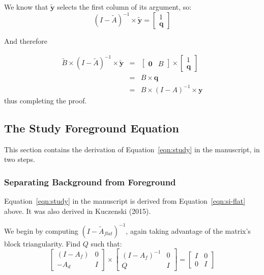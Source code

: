 We know that $\tilde{\mathbf{y}}$ selects the first column of its argument, so:
\begin{equation}
  (I-\tilde{A})^{-1}\times\tilde{\mathbf{y}} = \left[\begin{array}{c}
      1\\
      \mathbf{q}
    \end{array}\right]
\end{equation}

And therefore

\begin{eqnarray}
  \tilde{B}\times(I-\tilde{A})^{-1}\times\tilde{\mathbf{y}} &=& \left[\begin{array}{cc}\mathbf{0}&B\end{array}\right]\times\left[\begin{array}{c}
      1\\
      \mathbf{q}
    \end{array}\right]\\
   &=&B\times\mathbf{q}\\
   &=&B\times(I-A)^{-1}\times\mathbf{y}
\end{eqnarray}
thus completing the proof.

\subsection{The Study Foreground Equation}

This section contains the derivation of Equation~\ref{eqn:study} in the manuscript, in two steps.



\subsubsection{Separating Background from Foreground}
  
Equation~\ref{eqn:study} in the manuscript is derived from Equation~\ref{eqn:si-flat} above.  It was also derived in Kuczenski (2015).

We begin by computing $(I-\tilde{A}_{flat})^{-1}$, again taking advantage of the matrix's block triangularity.  Find $Q$ such that:
\begin{equation}
  \left[\begin{array}{cc} (I-A_f) & 0 \\ -A_d & I\end{array}\right]\times
  \left[\begin{array}{cc} (I-A_f)^{-1} & 0 \\ Q & I\end{array}\right] =
  \left[\begin{array}{cc} I & 0 \\ 0 & I\end{array}\right]
\end{equation}

